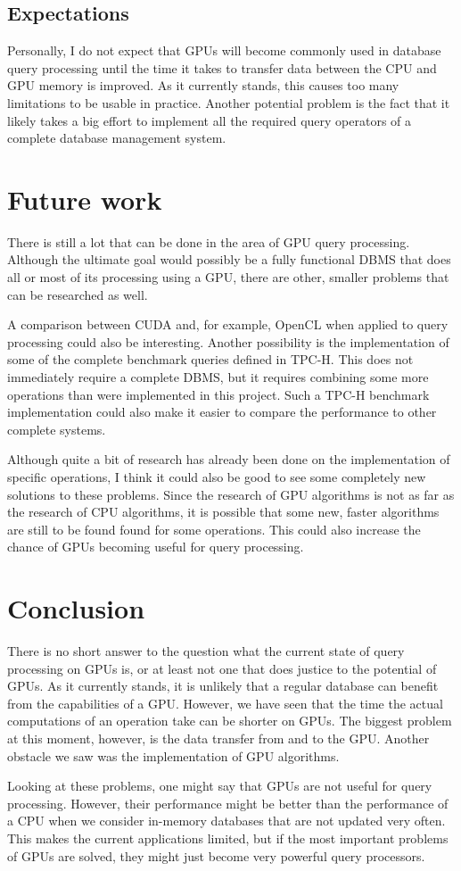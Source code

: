 \documentclass[a4paper,titlepage]{article}
\begin{document}
\subsection{Expectations}
Personally, I do not expect that GPUs will become commonly used in database query processing until the time it takes to transfer data between the CPU and GPU memory is improved. As it currently stands, this causes too many limitations to be usable in practice. Another potential problem is the fact that it likely takes a big effort to implement all the required query operators of a complete database management system.

\section{Future work}
There is still a lot that can be done in the area of GPU query processing. Although the ultimate goal would possibly be a fully functional DBMS that does all or most of its processing using a GPU, there are other, smaller problems that can be researched as well.

A comparison between CUDA and, for example, OpenCL when applied to query processing could also be interesting. Another possibility is the implementation of some of the complete benchmark queries defined in TPC-H. This does not immediately require a complete DBMS, but it requires combining some more operations than were implemented in this project. Such a TPC-H benchmark implementation could also make it easier to compare the performance to other complete systems.

Although quite a bit of research has already been done on the implementation of specific operations, I think it could also be good to see some completely new solutions to these problems. Since the research of GPU algorithms is not as far as the research of CPU algorithms, it is possible that some new, faster algorithms are still to be found found for some operations. This could also increase the chance of GPUs becoming useful for query processing.

\section{Conclusion}
\label{sec:conclusion}
There is no short answer to the question what the current state of query processing on GPUs is, or at least not one that does justice to the potential of GPUs. As it currently stands, it is unlikely that a regular database can benefit from the capabilities of a GPU. However, we have seen that the time the actual computations of an operation take can be shorter on GPUs. The biggest problem at this moment, however, is the data transfer from and to the GPU. Another obstacle we saw was the implementation of GPU algorithms. 

Looking at these problems, one might say that GPUs are not useful for query processing. However, their performance might be better than the performance of a CPU when we consider in-memory databases that are not updated very often. This makes the current applications limited, but if the most important problems of GPUs are solved, they might just become very powerful query processors.

{}

\end{document}
